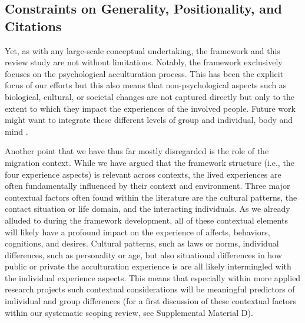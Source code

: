 \documentclass[man, 12pt, a4paper, mask]{apa7}
\newcommand{\sicontext}{Supplemental Material D}
\begin{document}
\subsection{Constraints on Generality, Positionality, and Citations}
Yet, as with any large-scale conceptual undertaking, the framework and this review study are not without limitations. Notably, the framework exclusively focuses on the psychological acculturation process. This has been the explicit focus of our efforts but this also means that non-psychological aspects such as biological, cultural, or societal changes are not captured directly but only to the extent to which they impact the experiences of the involved people. Future work might want to integrate these different levels of group and individual, body and mind \citep[e.g.,][]{Eronen2021}. 

Another point that we have thus far mostly disregarded is the role of the migration context. While we have argued that the framework structure (i.e., the four experience aspects) is relevant across contexts, the lived experiences are often fundamentally influenced by their context and environment. Three major contextual factors often found within the literature are the cultural patterns, the contact situation or life domain, and the interacting individuals. As we already alluded to during the framework development, all of these contextual elements will likely have a profound impact on the experience of affects, behaviors, cognitions, and desires. Cultural patterns, such as laws or norms, individual differences, such as personality or age, but also situational differences in how public or private the acculturation experience is are all likely intermingled with the individual experience aspects. This means that especially within more applied research projects such contextual considerations will be meaningful predictors of individual and group differences (for a first discussion of these contextual factors within our systematic scoping review, see \sicontext). 
\end{document}
